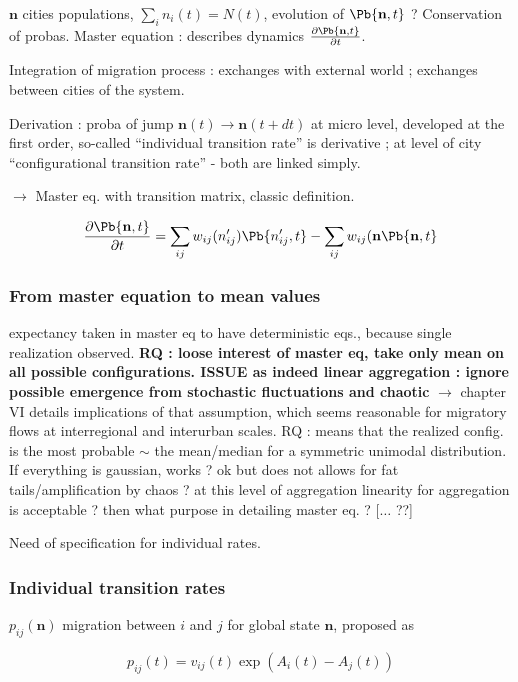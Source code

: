 $\mathbf{n}$ cities populations, $\sum_i n_i (t) = N(t)$, evolution of $\Pb{\mathbf{n},t}$ ? Conservation of probas. Master equation : describes dynamics $\frac{\partial \Pb{\mathbf{n},t}}{\partial t}$.

Integration of migration process : exchanges with external world ; exchanges between cities of the system.

Derivation : proba of jump $\mathbf{n}(t) \rightarrow \mathbf{n}(t + dt)$ at micro level, developed at the first order, so-called ``individual transition rate'' is derivative ; at level of city ``configurational transition rate'' - both are linked simply.

$\rightarrow$ Master eq. with transition matrix, classic definition.

\[
\frac{\partial \Pb{\mathbf{n},t}}{\partial t} = \sum_{ij}{w_{ij}(n'_{ij}) \Pb{n'_{ij},t}} - \sum_{ij}{w_{ij}(\mathbf{n}\Pb{\mathbf{n},t}}
\]


\subsubsection{From master equation to mean values}


expectancy taken in master eq to have deterministic eqs., because single realization observed. \textbf{RQ : loose interest of master eq, take only mean on all possible configurations. ISSUE as indeed linear aggregation : ignore possible emergence from stochastic fluctuations and chaotic } $\rightarrow$ chapter VI details implications of that assumption, which seems reasonable for migratory flows at interregional and interurban scales. RQ : means that the realized config. is the most probable $\sim$ the mean/median for a symmetric unimodal distribution. If everything is gaussian, works ? ok but does not allows for fat tails/amplification by chaos ? at this level of aggregation linearity for aggregation is acceptable ? then what purpose in detailing master eq. ? [$\ldots$ ??]

Need of specification for individual rates.

\subsubsection{Individual transition rates}

$p_{ij}(\mathbf{n})$ migration between $i$ and $j$ for global state $\mathbf{n}$, proposed as

\[
p_{ij}(t) = v_{ij}(t)\exp{(A_i(t) - A_j(t))}
\]

